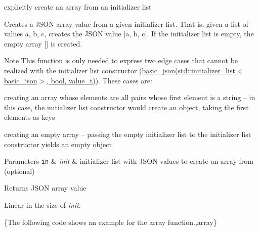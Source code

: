 explicitly create an array from an initializer list 

Creates a J\+S\+ON array value from a given initializer list. That is, given a list of values {\ttfamily a, b, c}, creates the J\+S\+ON value {\ttfamily \mbox{[}a, b, c\mbox{]}}. If the initializer list is empty, the empty array {\ttfamily \mbox{[}\mbox{]}} is created.

\begin{DoxyNote}{Note}
This function is only needed to express two edge cases that cannot be realized with the initializer list constructor (\hyperlink{classnlohmann_1_1basic__json_afeb998aec45296bc2050bd1c41ef41eb}{basic\+\_\+json(std\+::initializer\+\_\+list$<$basic\+\_\+json$>$, bool, value\+\_\+t)}). These cases are\+:
\begin{DoxyEnumerate}
\item creating an array whose elements are all pairs whose first element is a string -- in this case, the initializer list constructor would create an object, taking the first elements as keys
\item creating an empty array -- passing the empty initializer list to the initializer list constructor yields an empty object
\end{DoxyEnumerate}
\end{DoxyNote}

\begin{DoxyParams}[1]{Parameters}
\mbox{\tt in}  & {\em init} & initializer list with J\+S\+ON values to create an array from (optional)\\
\hline
\end{DoxyParams}
\begin{DoxyReturn}{Returns}
J\+S\+ON array value
\end{DoxyReturn}
Linear in the size of {\itshape init}.

\{The following code shows an example for the {\ttfamily array} function.,array\}

